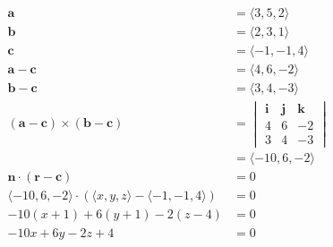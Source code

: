 \documentclass{article}
\begin{document}
\subsubsection{}

\begin{align*}
  \mathbf{a}                                                                             & = \langle 3, 5, 2 \rangle              \\
  \mathbf{b}                                                                             & = \langle 2, 3, 1 \rangle              \\
  \mathbf{c}                                                                             & = \langle -1, -1, 4 \rangle            \\
  \mathbf{a} - \mathbf{c}                                                                & = \langle 4, 6, -2 \rangle             \\
  \mathbf{b} - \mathbf{c}                                                                & = \langle 3, 4, -3 \rangle             \\
  (\mathbf{a} - \mathbf{c}) \times (\mathbf{b} - \mathbf{c})                             & = \begin{vmatrix}
                                                                                               \mathbf{i} & \mathbf{j} & \mathbf{k} \\
                                                                                               4          & 6          & -2         \\
                                                                                               3          & 4          & -3
                                                                                             \end{vmatrix} \\
                                                                                         & = \langle -10, 6, -2 \rangle           \\
  \mathbf{n} \cdot (\mathbf{r} - \mathbf{c})                                             & = 0                                    \\
  \langle -10, 6, -2 \rangle \cdot (\langle x, y, z \rangle - \langle -1, -1, 4 \rangle) & = 0                                    \\
  -10 (x + 1) + 6 (y + 1) - 2 (z - 4)                                                    & = 0                                    \\
  -10 x + 6 y - 2 z + 4                                                                  & = 0
\end{align*}
\end{document}
